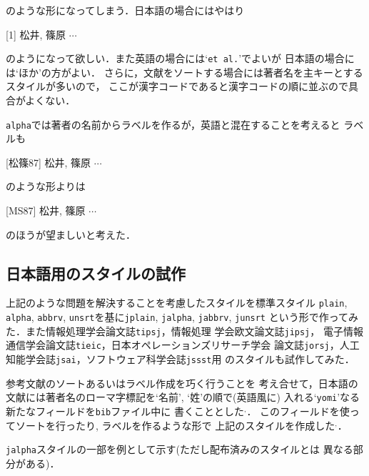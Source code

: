 \noindent のような形になってしまう．日本語の場合にはやはり

\vskip 2mm
\hskip1cm
[1] 松井, 篠原 $\cdots$
\vskip 2mm

\noindent のようになって欲しい．また英語の場合には`{\tt et al.}'でよいが
日本語の場合には`{\dg ほか}'の方がよい．
さらに，文献をソートする場合には著者名を主キーとするスタイルが多いので，
ここが漢字コードであると漢字コードの順に並ぶので具合がよくない．

{\tt alpha}では著者の名前からラベルを作るが，英語と混在することを考えると
ラベルも

\vskip 2mm
\hskip1cm
[松篠87] 松井, 篠原 $\cdots$
\vskip 2mm

\noindent のような形よりは

\vskip 2mm
\hskip1cm
[MS87] 松井, 篠原 $\cdots$
\vskip 2mm

\noindent のほうが望ましいと考えた．

\subsection{日本語用のスタイルの試作}

上記のような問題を解決することを考慮したスタイルを標準スタイル
{\tt plain}, {\tt alpha}, {\tt abbrv}, {\tt unsrt}を基に{\tt jplain}, 
{\tt jalpha}, {\tt jabbrv}, {\tt junsrt}
という形で作ってみた．また情報処理学会論文誌{\tt tipsj}，情報処理
学会欧文論文誌{\tt jipsj}，
電子情報通信学会論文誌{\tt tieic}，日本オペレーションズリサーチ学会
論文誌{\tt jorsj}，人工知能学会誌{\tt jsai}，ソフトウェア科学会誌{\tt jssst}用
のスタイルも試作してみた．

参考文献のソートあるいはラベル作成を巧く行うことを
考え合せて，日本語の文献には著者名のローマ字標記を`名前', `姓'の順で(英語風に)
入れる`{\tt yomi}'なる新たなフィールドを{\tt bib}ファイル中に
書くこととした$^,$．
このフィールドを使ってソートを行ったり, ラベルを作るような形で
上記のスタイルを作成した$^,$．

\newpage
{\tt jalpha}スタイルの一部を例として示す(ただし配布済みのスタイルとは
異なる部分がある)．

